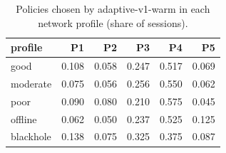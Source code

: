 \begin{table}[htbp]
\centering
\small
\caption{Policies chosen by adaptive-v1-warm in each network profile (share of sessions).}
\label{tab:policy_share_adaptive_v1_warm}
\begin{tabular}{l r r r r r}
\toprule
profile & P1 & P2 & P3 & P4 & P5 \\
\midrule
good & 0.108 & 0.058 & 0.247 & 0.517 & 0.069 \\
moderate & 0.075 & 0.056 & 0.256 & 0.550 & 0.062 \\
poor & 0.090 & 0.080 & 0.210 & 0.575 & 0.045 \\
offline & 0.062 & 0.050 & 0.237 & 0.525 & 0.125 \\
blackhole & 0.138 & 0.075 & 0.325 & 0.375 & 0.087 \\
\bottomrule
\end{tabular}
\end{table}
